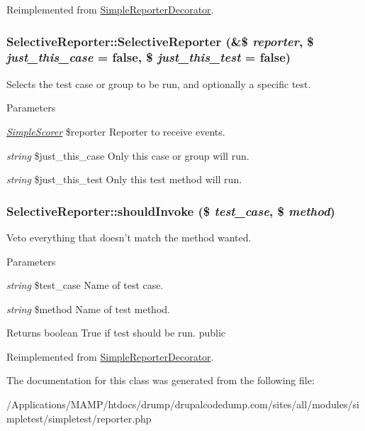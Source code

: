Reimplemented from \hyperlink{class_simple_reporter_decorator_a2e64b5bc09764a866715f80c3f2aeee7}{SimpleReporterDecorator}.\hypertarget{class_selective_reporter_af10c55382508bba90e9a7c1c2e88a695}{
\subsubsection[{SelectiveReporter}]{\setlength{\rightskip}{0pt plus 5cm}SelectiveReporter::SelectiveReporter (\&\$ {\em reporter}, \/  \$ {\em just\_\-this\_\-case} = {\ttfamily false}, \/  \$ {\em just\_\-this\_\-test} = {\ttfamily false})}}
\label{class_selective_reporter_af10c55382508bba90e9a7c1c2e88a695}
Selects the test case or group to be run, and optionally a specific test. 
\begin{DoxyParams}{Parameters}
\item[{\em \hyperlink{class_simple_scorer}{SimpleScorer}}]\$reporter Reporter to receive events. \item[{\em string}]\$just\_\-this\_\-case Only this case or group will run. \item[{\em string}]\$just\_\-this\_\-test Only this test method will run. \end{DoxyParams}
\hypertarget{class_selective_reporter_a33b86430bc37e8c5f35c246789a9a105}{
\subsubsection[{shouldInvoke}]{\setlength{\rightskip}{0pt plus 5cm}SelectiveReporter::shouldInvoke (\$ {\em test\_\-case}, \/  \$ {\em method})}}
\label{class_selective_reporter_a33b86430bc37e8c5f35c246789a9a105}
Veto everything that doesn't match the method wanted. 
\begin{DoxyParams}{Parameters}
\item[{\em string}]\$test\_\-case Name of test case. \item[{\em string}]\$method Name of test method. \end{DoxyParams}
\begin{DoxyReturn}{Returns}
boolean True if test should be run.  public 
\end{DoxyReturn}


Reimplemented from \hyperlink{class_simple_reporter_decorator_a571852c647ef03d0486353aed21d79f9}{SimpleReporterDecorator}.

The documentation for this class was generated from the following file:\begin{DoxyCompactItemize}
\item 
/Applications/MAMP/htdocs/drump/drupalcodedump.com/sites/all/modules/simpletest/simpletest/reporter.php\end{DoxyCompactItemize}
